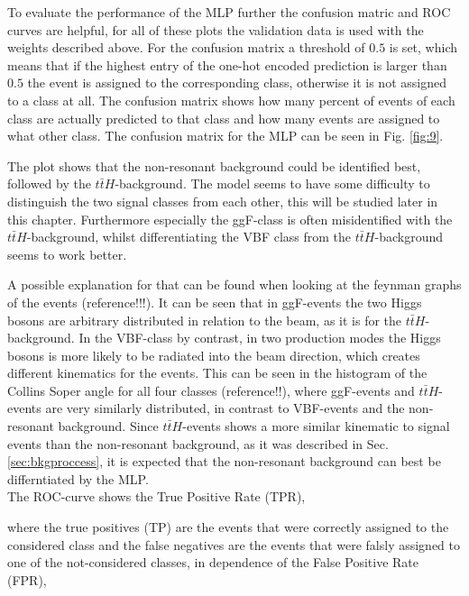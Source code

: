 To evaluate the performance of the MLP further the confusion matric and ROC curves are helpful, for all of these plots the validation data is used with the weights described above.
For the confusion matrix a threshold of $0.5$ is set, which means that if the highest entry
of the one-hot encoded prediction is larger than $0.5$ the event is assigned to the corresponding class, otherwise it is not assigned to a class at all. The confusion matrix shows
how many percent of events of each class are actually predicted to that class and how many events are assigned to what other class. The confusion matrix for the MLP can be seen in Fig. \ref{fig:9}.


The plot shows that the non-resonant background could be identified best, followed by the $t \bar{t} H$-background. The model seems to have some difficulty to distinguish
the two signal classes from each other, this will be studied later in this chapter. Furthermore especially the ggF-class is often misidentified with the $t \bar{t}H$-background, whilst differentiating the VBF class from the $t \bar{t}H$-background seems to work better.

A possible explanation for that can be found when looking at the feynman graphs of the events (reference!!!). It can be seen that in ggF-events the two Higgs bosons are arbitrary distributed in relation to the beam, as it is for the $t \bar{t}H$-background.
In the VBF-class by contrast, in two production modes the Higgs bosons is more likely to be radiated into the beam direction, which creates different kinematics for the events. This can be seen in the histogram of the Collins Soper angle for all four classes (reference!!), where ggF-events
and $t \bar{t} H$-events are very similarly distributed, in contrast to VBF-events and the non-resonant background.
Since $t \bar{t} H$-events shows a more similar kinematic to signal events than the non-resonant background, as it was described in Sec. \ref{sec:bkgproccess}, it is expected
that the non-resonant background can best be differntiated by the MLP.\\ 

The ROC-curve shows the True Positive Rate (TPR),


where the true positives (TP) are the events that were correctly assigned to the considered class and the false negatives are the events that were falsly assigned to one of the not-considered classes,
in dependence of the False Positive Rate (FPR),

